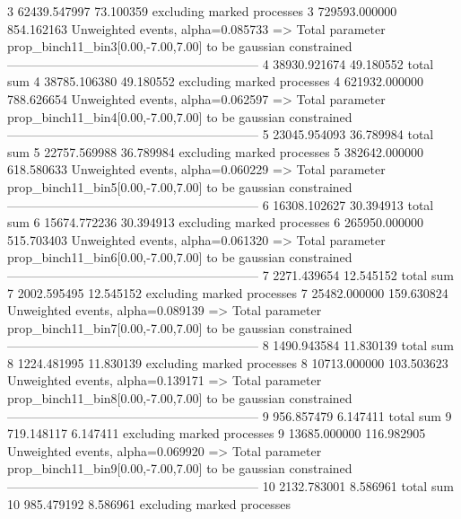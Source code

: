 3          62439.547997    73.100359       excluding marked processes    
3          729593.000000   854.162163      Unweighted events, alpha=0.085733
  => Total parameter prop_binch11_bin3[0.00,-7.00,7.00] to be gaussian constrained
------------------------------------------------------------
4          38930.921674    49.180552       total sum                     
4          38785.106380    49.180552       excluding marked processes    
4          621932.000000   788.626654      Unweighted events, alpha=0.062597
  => Total parameter prop_binch11_bin4[0.00,-7.00,7.00] to be gaussian constrained
------------------------------------------------------------
5          23045.954093    36.789984       total sum                     
5          22757.569988    36.789984       excluding marked processes    
5          382642.000000   618.580633      Unweighted events, alpha=0.060229
  => Total parameter prop_binch11_bin5[0.00,-7.00,7.00] to be gaussian constrained
------------------------------------------------------------
6          16308.102627    30.394913       total sum                     
6          15674.772236    30.394913       excluding marked processes    
6          265950.000000   515.703403      Unweighted events, alpha=0.061320
  => Total parameter prop_binch11_bin6[0.00,-7.00,7.00] to be gaussian constrained
------------------------------------------------------------
7          2271.439654     12.545152       total sum                     
7          2002.595495     12.545152       excluding marked processes    
7          25482.000000    159.630824      Unweighted events, alpha=0.089139
  => Total parameter prop_binch11_bin7[0.00,-7.00,7.00] to be gaussian constrained
------------------------------------------------------------
8          1490.943584     11.830139       total sum                     
8          1224.481995     11.830139       excluding marked processes    
8          10713.000000    103.503623      Unweighted events, alpha=0.139171
  => Total parameter prop_binch11_bin8[0.00,-7.00,7.00] to be gaussian constrained
------------------------------------------------------------
9          956.857479      6.147411        total sum                     
9          719.148117      6.147411        excluding marked processes    
9          13685.000000    116.982905      Unweighted events, alpha=0.069920
  => Total parameter prop_binch11_bin9[0.00,-7.00,7.00] to be gaussian constrained
------------------------------------------------------------
10         2132.783001     8.586961        total sum                     
10         985.479192      8.586961        excluding marked processes    
